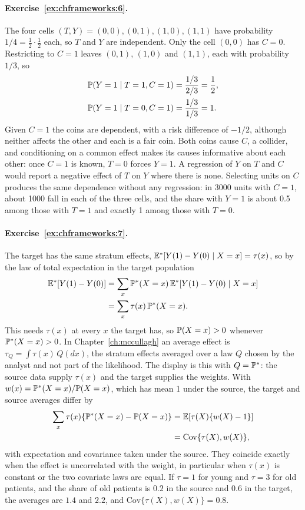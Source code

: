 \paragraph{Exercise~\ref{ex:chframeworks:6}.} The four cells $(T, Y) = (0,0), (0,1), (1,0), (1,1)$ have probability $1/4 = \tfrac12\cdot\tfrac12$ each, so $T$ and $Y$ are independent. Only the cell $(0,0)$ has $C = 0$. Restricting to $C = 1$ leaves $(0,1)$, $(1,0)$ and $(1,1)$, each with probability $1/3$, so
\begin{align*}
\mathbb{P}(Y=1 \mid T=1, C=1) &= \frac{1/3}{2/3} = \frac12,\\
\mathbb{P}(Y=1 \mid T=0, C=1) &= \frac{1/3}{1/3} = 1.
\end{align*}
Given $C = 1$ the coins are dependent, with a risk difference of $-1/2$, although neither affects the other and each is a fair coin. Both coins cause $C$, a collider, and conditioning on a common effect makes its causes informative about each other: once $C = 1$ is known, $T = 0$ forces $Y = 1$. A regression of $Y$ on $T$ and $C$ would report a negative effect of $T$ on $Y$ where there is none. Selecting units on $C$ produces the same dependence without any regression: in 3000 units with $C = 1$, about 1000 fall in each of the three cells, and the share with $Y = 1$ is about 0.5 among those with $T = 1$ and exactly 1 among those with $T = 0$.

\paragraph{Exercise~\ref{ex:chframeworks:7}.} The target has the same stratum effects, $\mathbb{E}^\ast[Y(1) - Y(0) \mid X = x] = \tau(x)$, so by the law of total expectation in the target population
\begin{align*}
\mathbb{E}^\ast[Y(1) - Y(0)] &= \sum_x \mathbb{P}^\ast(X = x)\,\mathbb{E}^\ast[Y(1) - Y(0) \mid X = x]\\
&= \sum_x \tau(x)\,\mathbb{P}^\ast(X = x).
\end{align*}
This needs $\tau(x)$ at every $x$ the target has, so $\mathbb{P}(X = x) > 0$ whenever $\mathbb{P}^\ast(X = x) > 0$. In Chapter~\ref{ch:mccullagh} an average effect is $\tau_Q = \int \tau(x)\,Q(dx)$, the stratum effects averaged over a law $Q$ chosen by the analyst and not part of the likelihood. The display is this with $Q = \mathbb{P}^\ast$: the source data supply $\tau(x)$ and the target supplies the weights. With $w(x) = \mathbb{P}^\ast(X = x)/\mathbb{P}(X = x)$, which has mean 1 under the source, the target and source averages differ by
\begin{align*}
\sum_x \tau(x)\{\mathbb{P}^\ast(X = x) - \mathbb{P}(X = x)\} &= \mathbb{E}[\tau(X)\{w(X) - 1\}]\\
&= \mathrm{Cov}\{\tau(X), w(X)\},
\end{align*}
with expectation and covariance taken under the source. They coincide exactly when the effect is uncorrelated with the weight, in particular when $\tau(x)$ is constant or the two covariate laws are equal. If $\tau = 1$ for young and $\tau = 3$ for old patients, and the share of old patients is $0.2$ in the source and $0.6$ in the target, the averages are $1.4$ and $2.2$, and $\mathrm{Cov}\{\tau(X), w(X)\} = 0.8$.

